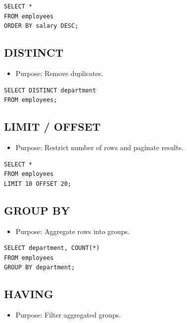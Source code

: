 \documentclass[10pt]{article}
\begin{document}
\begin{verbatim}
SELECT *
FROM employees
ORDER BY salary DESC;
\end{verbatim}

\subsection{DISTINCT}
\begin{itemize}
    \item Purpose: Remove duplicates.
\end{itemize}

\begin{verbatim}
SELECT DISTINCT department
FROM employees;
\end{verbatim}

\subsection{LIMIT / OFFSET}
\begin{itemize}
    \item Purpose: Restrict number of rows and paginate results.
\end{itemize}

\begin{verbatim}
SELECT *
FROM employees
LIMIT 10 OFFSET 20;
\end{verbatim}

\subsection{GROUP BY}
\begin{itemize}
    \item Purpose: Aggregate rows into groups.
\end{itemize}

\begin{verbatim}
SELECT department, COUNT(*)
FROM employees
GROUP BY department;
\end{verbatim}

\subsection{HAVING}
\begin{itemize}
    \item Purpose: Filter aggregated groups.
\end{itemize}
\end{document}
